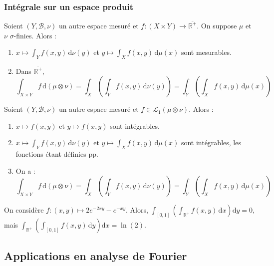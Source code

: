 	\subsubsection{Intégrale sur un espace produit}
	
	
	\begin{theorem}
		Soient $(Y, \mathcal{B}, \nu)$ un autre espace mesuré et $f : (X \times Y) \rightarrow \overline{\mathbb{R}^+}$. On suppose $\mu$ et $\nu$ $\sigma$-finies. Alors :
		\begin{enumerate}[label=(\roman*)]
			\item $x \mapsto \int_Y f(x,y) \, \mathrm{d}\nu(y)$ et $y \mapsto \int_X f(x,y) \, \mathrm{d}\mu(x)$ sont mesurables.
			\item Dans $\overline{\mathbb{R}^+}$,
			\[ \int_{X \times Y} f \, \mathrm{d}(\mu \otimes \nu) = \int_X \left( \int_Y f(x,y) \, \mathrm{d}\nu(y) \right) = \int_Y \left( \int_X f(x,y) \, \mathrm{d}\mu(x) \right) \]
		\end{enumerate}
	\end{theorem}
	
	\begin{theorem}
		Soient $(Y, \mathcal{B}, \nu)$ un autre espace mesuré et $f \in \mathcal{L}_1 (\mu \otimes \nu)$. Alors :
		\begin{enumerate}[label=(\roman*)]
			\item $x \mapsto f(x,y)$ et $y \mapsto f(x,y)$ sont intégrables.
			\item $x \mapsto \int_Y f(x,y) \, \mathrm{d}\nu(y)$ et $y \mapsto \int_X f(x,y) \, \mathrm{d}\mu(x)$ sont intégrables, les fonctions étant définies pp.
			\item On a :
			\[ \int_{X \times Y} f \, \mathrm{d}(\mu \otimes \nu) = \int_X \left( \int_Y f(x,y) \, \mathrm{d}\nu(y) \right) = \int_Y \left( \int_X f(x,y) \, \mathrm{d}\mu(x) \right) \]
		\end{enumerate}
	\end{theorem}
	
	\begin{cexample}
		On considère $f : (x,y) \mapsto 2e^{-2xy} - e^{-xy}$. Alors, $\int_{[0,1]} \left( \int_{\mathbb{R}^+} f(x,y) \, \mathrm{d}x \right) \mathrm{d}y = 0$, mais $\int_{\mathbb{R}^+} \left( \int_{[0,1]} f(x,y) \, \mathrm{d}y \right) \mathrm{d}x = \ln(2)$.
	\end{cexample}
	
	\subsection{Applications en analyse de Fourier}
	
